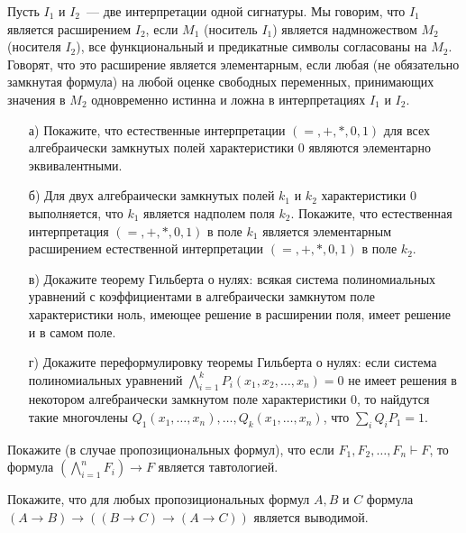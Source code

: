 

Пусть $I_1$ и $I_2$~--- две интерпретации одной сигнатуры. Мы говорим, что $I_1$ является расширением $I_2$, если $M_1$ (носитель
$I_1$) является надмножеством $M_2$ (носителя $I_2$), все функциональный и предикатные символы согласованы на $M_2$. Говорят, что
это расширение является элементарным, если любая (не обязательно замкнутая формула) на любой оценке свободных переменных,
принимающих значения в $M_2$ одновременно истинна и ложна в интерпретациях $I_1$ и $I_2$.

\begin{task}
    \begin{enumerate}[topsep = 0pt, itemsep = -1ex]
        \item [а)] Покажите, что естественные интерпретации $(=, +, *, 0, 1)$ для всех алгебраически замкнутых полей
			характеристики $0$ являются элементарно эквивалентными.
        \item [б)] Для двух алгебраически замкнутых полей $k_1$ и $k_2$ характеристики $0$ выполняется, что $k_1$ является
		    надполем поля $k_2$. Покажите, что естественная интерпретация $(=, +, *, 0, 1)$ в поле $k_1$ является элементарным
            расширением естественной интерпретации $(=, +, *, 0, 1)$ в поле $k_2$.
        \item [в)] Докажите теорему Гильберта о нулях: всякая система полиномиальных уравнений с коэффициентами в алгебраически
			замкнутом поле характеристики ноль, имеющее решение в расширении поля, имеет решение и в самом поле.
        \item [г)] Докажите переформулировку теоремы Гильберта о нулях: если система полиномиальных уравнений
        	$\bigwedge\limits_{i = 1}^k P_i(x_1, x_2, \dots, x_n) = 0$ не имеет решения в некотором алгебраически замкнутом поле
            характеристики $0$, то найдутся такие многочлены $Q_1(x_1, \dots, x_n), \dots, Q_k(x_1, \dots, x_n)$, что
            $\sum\limits_i Q_i P_1 = 1$.
    \end{enumerate}
\end{task}

\begin{task}
	Покажите (в случае пропозициональных формул), что если $F_1, F_2, \dots, F_n \vdash F$, то формула $(\bigwedge\limits_{i = 1}^n
    F_i) \to F$ является тавтологией.
\end{task}

\begin{task}
	Покажите, что для любых пропозициональных формул $A, B$ и $C$ формула $(A \to B) \to ((B \to C) \to (A \to C))$ является
    выводимой.
\end{task}

